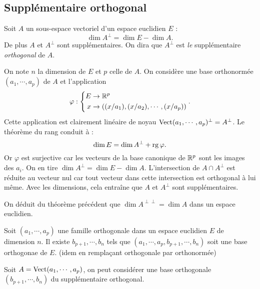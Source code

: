 \subsection{Supplémentaire orthogonal}
\begin{thm} Soit $A$ un sous-espace vectoriel d'un espace euclidien $E$ : 
 \begin{displaymath}
 \dim A^{\perp} = \dim E - \dim A .
\end{displaymath}
De plus $A$ et $A^\perp$ sont supplémentaires. On dira que $A^\bot$ est \emph{le} supplémentaire \emph{orthogonal} de $A$.
\end{thm}
\begin{demo}
On note $n$ la dimension de $E$ et $p$ celle de $A$. On considère une base orthonormée $(a_1,\cdots,a_p)$ de $A$ et l'application
\begin{displaymath}
\varphi : \left\lbrace 
 \begin{aligned}
  E &\rightarrow \mathbb{R}^p \\
  x &\rightarrow \left( (x/a_1),(x/a_2),\cdots,(x/a_p)\right) 
 \end{aligned}
\right. .
\end{displaymath}
Cette application est clairement linéaire de noyau $\mathop{\mathrm{Vect}}(a_1,\cdots,a_p)^\bot= A^\bot$. Le théorème du rang conduit à :
\begin{displaymath}
 \dim E = \dim A^\bot +\mathop{\mathrm{rg}} \varphi .
\end{displaymath}
Or $\varphi$ est surjective car les vecteurs de la base canonique de $\mathbb{R}^p$ sont les images des $a_i$. On en tire $\dim A^\bot = \dim E - \dim A$.\newline
L'intersection de $A\cap A^\bot$ est réduite au vecteur nul car tout vecteur dans cette intersection est orthogonal à lui même. Avec les dimensions, cela entraîne que $A$ et $A^\bot$ sont supplémentaires.
\end{demo}
\begin{rem}
 On déduit du théorème précédent que $\dim A^{\perp\perp} = \dim A$ dans un espace euclidien.
\end{rem}
\clearpage
{}
\begin{prop}
 Soit $(a_1,\cdots,a_p)$ une famille orthogonale dans un espace euclidien $E$ de dimension $n$. Il existe $b_{p+1},\cdots,b_n$ tels que $(a_1,\cdots,a_p,b_{p+1},\cdots,b_n)$ soit une base orthogonae de $E$. (idem en remplaçant orthogonale par orthonormée)
\end{prop}
\begin{demo}
 Soit $A=\mathop{\mathrm{Vect}}(a_1,\cdots,a_p)$, on peut considérer une base orthogonale $(b_{p+1},\cdots,b_n)$ du supplémentaire orthogonal.
\end{demo}
